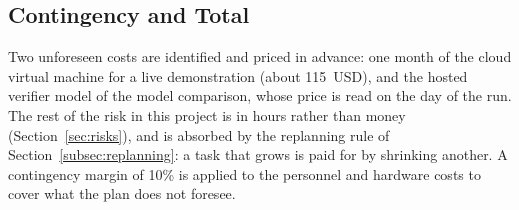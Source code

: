 
\subsection{Contingency and Total}

Two unforeseen costs are identified and priced in advance: one month of
the cloud virtual machine for a live demonstration (about 115~USD), and
the hosted verifier model of the model comparison, whose price is read
on the day of the run. The rest of the risk in this project is in hours
rather than money (Section~\ref{sec:risks}), and is absorbed by the
replanning rule of Section~\ref{subsec:replanning}: a task that grows is
paid for by shrinking another. A contingency margin of 10\% is applied
to the personnel and hardware costs to cover what the plan does not
foresee.

